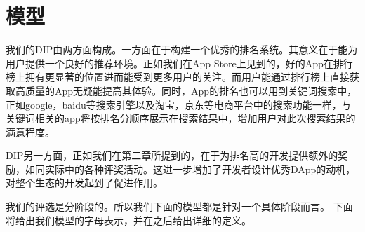 \section{模型}
我们的DIP由两方面构成。一方面在于构建一个优秀的排名系统。其意义在于能为用户提供一个良好的推荐环境。正如我们在App Store上见到的，好的App在排行榜上拥有更显著的位置进而能受到更多用户的关注。而用户能通过排行榜上直接获取高质量的App无疑能提高其体验。同时，App的排名也可以用到关键词搜索中，正如google，baidu等搜索引擎以及淘宝，京东等电商平台中的搜索功能一样，与关键词相关的app将按排名分顺序展示在搜索结果中，增加用户对此次搜索结果的满意程度。

DIP另一方面，正如我们在第二章所提到的，在于为排名高的开发提供额外的奖励，如同实际中的各种评奖活动。这进一步增加了开发者设计优秀DApp的动机，对整个生态的开发起到了促进作用。

我们的评选是分阶段的。所以我们下面的模型都是针对一个具体阶段而言。
下面将给出我们模型的字母表示，并在之后给出详细的定义。

